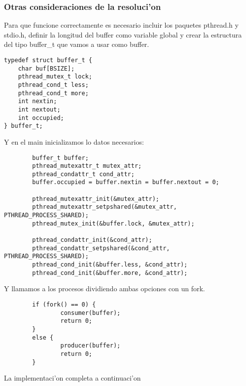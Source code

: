 \subsubsection{Otras consideraciones de la resoluci'on}
Para que funcione correctamente es necesario incluir los paquetes pthread.h y stdio.h, definir la longitud del buffer como variable global y crear la estructura del tipo buffer\_t que vamos a usar como buffer.
\begin{mylisting}
\begin{verbatim}
typedef struct buffer_t {
	char buf[BSIZE];
	pthread_mutex_t lock;
	pthread_cond_t less;
	pthread_cond_t more;
	int nextin;
	int nextout;
	int occupied;
} buffer_t;
\end{verbatim}
\end{mylisting}
Y en el main inicializamos lo datos necesarios:
\begin{mylisting}
\begin{verbatim}
        buffer_t buffer;
        pthread_mutexattr_t mutex_attr;
        pthread_condattr_t cond_attr;
        buffer.occupied = buffer.nextin = buffer.nextout = 0;
        
        pthread_mutexattr_init(&mutex_attr);
        pthread_mutexattr_setpshared(&mutex_attr, PTHREAD_PROCESS_SHARED);
        pthread_mutex_init(&buffer.lock, &mutex_attr);
        
        pthread_condattr_init(&cond_attr);
        pthread_condattr_setpshared(&cond_attr, PTHREAD_PROCESS_SHARED);
        pthread_cond_init(&buffer.less, &cond_attr);
        pthread_cond_init(&buffer.more, &cond_attr);
\end{verbatim}
\end{mylisting}
Y llamamos a los procesos dividiendo ambas opciones con un fork.
\begin{mylisting}
\begin{verbatim}
        if (fork() == 0) {
                consumer(buffer);
                return 0;
        }
        else {
                producer(buffer);
                return 0;
        }
\end{verbatim}
\end{mylisting}
La implementaci'on completa a continuaci'on

